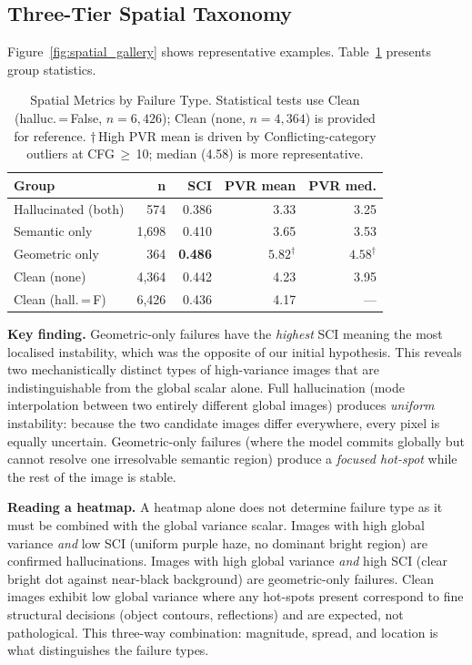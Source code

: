 \documentclass[conference]{IEEEtran}
\begin{document}
\subsection{Three-Tier Spatial Taxonomy}
\label{sec:taxonomy}

Figure~\ref{fig:spatial_gallery} shows representative examples.
Table~\ref{tab:spatial} presents group statistics.

\begin{table}[h]
\centering
\caption{Spatial Metrics by Failure Type. Statistical tests use
Clean (halluc.\,=\,False, $n{=}6{,}426$); Clean (none, $n{=}4{,}364$)
is provided for reference. $\dagger$\,High PVR mean is driven by
Conflicting-category outliers at CFG\,${\geq}$\,10; median (4.58)
is more representative.}
\label{tab:spatial}
\small
\begin{tabular}{lrrrr}
\toprule
\textbf{Group} & \textbf{n} & \textbf{SCI} & \textbf{PVR mean} & \textbf{PVR med.} \\
\midrule
Hallucinated (both) & 574   & 0.386 & 3.33 & 3.25 \\
Semantic only       & 1{,}698 & 0.410 & 3.65 & 3.53 \\
Geometric only      & 364   & \textbf{0.486} & $5.82^\dagger$ & $4.58^\dagger$ \\
Clean (none)        & 4{,}364 & 0.442 & 4.23 & 3.95 \\
Clean (hall.\,=\,F) & 6{,}426 & 0.436 & 4.17 & --- \\
\bottomrule
\end{tabular}
\end{table}

\textbf{Key finding.} Geometric-only failures have the \emph{highest}
SCI meaning the most localised instability, which was the opposite of our
initial hypothesis. This reveals two mechanistically distinct types
of high-variance images that are indistinguishable from the global
scalar alone. Full hallucination (mode interpolation between two
entirely different global images) produces \emph{uniform} instability:
because the two candidate images differ everywhere, every pixel is
equally uncertain. Geometric-only failures (where the model commits
globally but cannot resolve one irresolvable semantic region) produce
a \emph{focused hot-spot} while the rest of the image is stable.

\textbf{Reading a heatmap.} A heatmap alone does not determine failure
type as it must be combined with the global variance scalar. Images with
high global variance \emph{and} low SCI (uniform purple haze, no
dominant bright region) are confirmed hallucinations. Images with high
global variance \emph{and} high SCI (clear bright dot against near-black
background) are geometric-only failures. Clean images exhibit low global
variance where any hot-spots present correspond to fine structural decisions
(object contours, reflections) and are expected, not pathological.
This three-way combination: magnitude, spread, and location is what
distinguishes the failure types.
\end{document}
